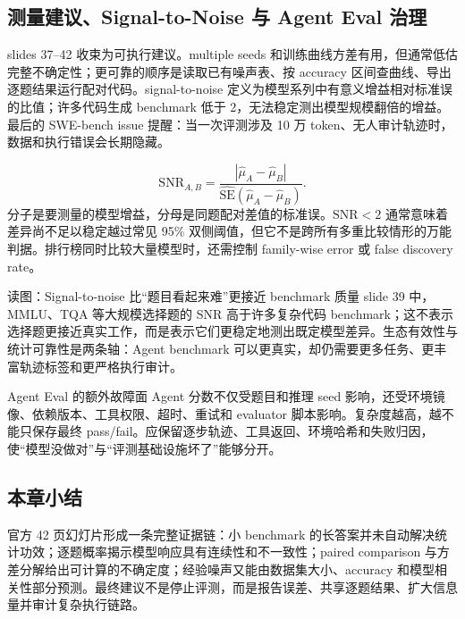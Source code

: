 \subsection{测量建议、Signal-to-Noise 与 Agent Eval 治理}

slides 37--42 收束为可执行建议。multiple seeds 和训练曲线方差有用，但通常低估完整不确定性；更可靠的顺序是读取已有噪声表、按 accuracy 区间查曲线、导出逐题结果运行配对代码。signal-to-noise 定义为模型系列中有意义增益相对标准误的比值；许多代码生成 benchmark 低于 2，无法稳定测出模型规模翻倍的增益。最后的 SWE-bench issue 提醒：当一次评测涉及 10 万 token、无人审计轨迹时，数据和执行错误会长期隐藏。


\[
\mathrm{SNR}_{A,B}
=\frac{|\widehat\mu_A-\widehat\mu_B|}
{\widehat{\mathrm{SE}}(\widehat\mu_A-\widehat\mu_B)}.
\]
分子是要测量的模型增益，分母是同题配对差值的标准误。$\mathrm{SNR}<2$ 通常意味着差异尚不足以稳定越过常见 95\% 双侧阈值，但它不是跨所有多重比较情形的万能判据。排行榜同时比较大量模型时，还需控制 family-wise error 或 false discovery rate。

\begin{knowledgebox}{读图：Signal-to-noise 比“题目看起来难”更接近 benchmark 质量}
slide 39 中，MMLU、TQA 等大规模选择题的 SNR 高于许多复杂代码 benchmark；这不表示选择题更接近真实工作，而是表示它们更稳定地测出既定模型差异。生态有效性与统计可靠性是两条轴：Agent benchmark 可以更真实，却仍需要更多任务、更丰富轨迹标签和更严格执行审计。
\end{knowledgebox}

\begin{warningbox}{Agent Eval 的额外故障面}
Agent 分数不仅受题目和推理 seed 影响，还受环境镜像、依赖版本、工具权限、超时、重试和 evaluator 脚本影响。复杂度越高，越不能只保存最终 pass/fail。应保留逐步轨迹、工具返回、环境哈希和失败归因，使“模型没做对”与“评测基础设施坏了”能够分开。
\end{warningbox}

\subsection{本章小结}
官方 42 页幻灯片形成一条完整证据链：小 benchmark 的长答案并未自动解决统计功效；逐题概率揭示模型响应具有连续性和不一致性；paired comparison 与方差分解给出可计算的不确定度；经验噪声又能由数据集大小、accuracy 和模型相关性部分预测。最终建议不是停止评测，而是报告误差、共享逐题结果、扩大信息量并审计复杂执行链路。

